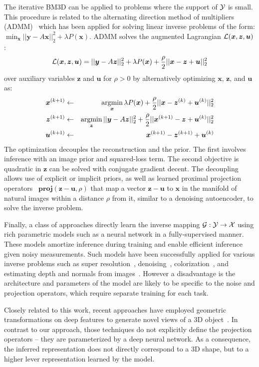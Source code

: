 The iterative BM3D can be applied to problems where the support of ${\cal Y}$ is small. 
This procedure is related to the alternating direction method of multipliers (ADMM)~\cite{boyd2011distributed} which has been applied for solving linear inverse problems of the form: $\min_{\bm{x}} ||\bm{y}-A\bm{x}||_2^2 + \lambda P(\bm{x}).$
ADMM solves the augmented Lagrangian ${\cal L}(\bm{x},\bm{z},\bm{u})$:
\begin{equation}
{\cal L}(\bm{x},\bm{z},\bm{u}) = ||\bm{y}-A\bm{z}||_2^2 + \lambda P(\bm{x}) + \frac{\rho}{2}||\bm{x} - \bm{z} + \bm{u}||_2^2 \nonumber
\end{equation} 
over auxiliary variables $\bm{z}$ and $\bm{u}$ for $\rho > 0$ by alternatively optimizing $\bm{x}$, $\bm{z}$, and $\bm{u}$ as:
\begin{eqnarray}
\bm{x}^{(k+1)} &\leftarrow& \operatorname*{argmin}_{\bm{x}}\lambda P(\bm{x}) + \frac{\rho}{2}||\bm{x} - \bm{z}^{(k)} + \bm{u}^{(k)}||_2^2 \nonumber \\
\bm{z}^{(k+1)} &\leftarrow& \operatorname*{argmin}_{\bm{z}}||\bm{y}-A\bm{z}||_2^2 + \frac{\rho}{2}||\bm{x}^{(k+1)} - \bm{z} + \bm{u}^{(k)}||_2^2 \nonumber \\
\bm{u}^{(k+1)} &\leftarrow& \bm{x}^{(k+1)} - \bm{z}^{(k+1)} + \bm{u}^{(k)} \nonumber
\end{eqnarray}
The optimization decouples the reconstruction and the prior. The first involves inference with an image prior and squared-loss term. The second objective is quadratic in $\mathbf{z}$ can be solved with conjugate gradient decent. The decoupling allows use of explicit or implicit priors, as well as learned proximal projection operators~\cite{yandeepadmm16,chang2017one} $\textbf{proj}(\bm{z}-\bm{u}, \rho)$ that map a vector $\bm{z}-\bm{u}$ to $\bm{x}$ in the manifold of natural images within a distance $\rho$ from it, similar to a denoising autoencoder, to solve the inverse problem.

Finally, a class of approaches directly learn the inverse mapping ${\cal G}:{\cal Y} \rightarrow {\cal X}$ using rich parametric models such as a neural network in a fully-supervised manner.
These models amortize inference during training and enable efficient inference given noisy measurements.
Such models have been successfully applied for various inverse problems such as super resolution~\cite{dong2014learning}, denoising~\cite{xie2012image}, colorization~\cite{larsson2016learning,zhang2016colorful}, and estimating depth and normals from images~\cite{eigen2014depth}.
However a disadvantage is the architecture and parameters of the model are likely to be specific to the noise and projection operators, which require separate training for each task.

Closely related to this work, recent approaches have employed geometric transformations on deep features to generate novel views of a 3D object~\cite{hologan, deepvoxels}.
In contrast to our approach, those techniques do not explicitly define the projection operators -- they are parameterized by a deep neural network.
As a consequence, the inferred representation does not directly correspond to a 3D shape, but to a higher lever representation learned by the model.


